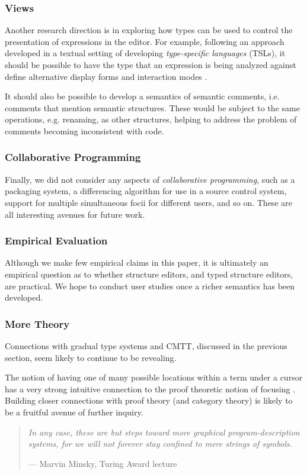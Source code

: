 \documentclass[9pt]{sigplanconf}
\begin{document}
\subsubsection{Views}
Another research direction is in exploring how types can be used to control
the presentation of expressions in the editor. For example, following an
approach developed in a textual setting of developing \emph{type-specific
languages} (TSLs), it should be possible to have the type that an
expression is being analyzed against define alternative display forms and
interaction modes \cite{TSLs}.

It should also be possible to develop a semantics of semantic comments,
i.e. comments that mention semantic structures. These would be subject to
the same operations, e.g. renaming, as other structures, helping to address
the problem of comments becoming inconsistent with code.

\subsubsection{Collaborative Programming}
Finally, we did not consider any aspects of \emph{collaborative
programming}, such as a packaging system, a differencing algorithm for use
in a source control system, support for multiple simultaneous focii for
different users, and so on. These are all interesting avenues for future
work.

\subsubsection{Empirical Evaluation}
Although we make few empirical claims in this paper, it is ultimately an
empirical question as to whether structure editors, and typed structure
editors, are practical. We hope to conduct user studies once a richer
semantics has been developed.

\subsubsection{More Theory}
Connections with gradual type systems and CMTT, discussed in the previous
section, seem likely to continue to be revealing.

The notion of having one of many possible locations within a term under a
cursor has a very strong intuitive connection to the proof theoretic notion
of focusing \cite{Simmons11tr}. Building closer connections with proof
theory (and category theory) is likely to be a fruitful avenue of further
inquiry.

\begin{quote}
\emph{In any case, these are but steps toward more graphical program-description
systems, for we will not forever stay confined to mere strings of symbols.}

--- Marvin Minsky, Turing Award lecture \cite{DBLP:journals/jacm/Minsky70}
\end{quote}

\clearpage




\iftr
\clearpage
\appendix

\else
\fi
\end{document}
